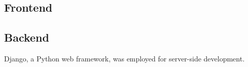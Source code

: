 \subsection{Frontend}

\subsection{Backend}
Django, a Python web framework, was employed for server-side development.
